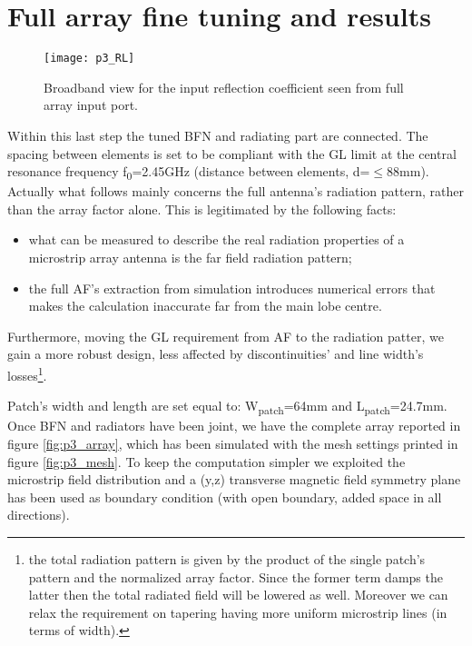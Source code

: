 
\newpage
\section{Full array fine tuning and results}

\begin{figure}[t] 
	\centering
	\texttt{[image: p3\_RL]}
	\caption{Broadband view for the input reflection coefficient seen from full array input port.}
	\label{fig:p3_scattering}
\end{figure}
Within this last step the tuned BFN and radiating part are connected. The spacing between elements is set to be compliant with the GL limit at the central resonance frequency f\textsubscript{0}=2.45GHz (distance between elements, d=$\leq$88mm). 
Actually what follows mainly concerns the full antenna's radiation pattern, rather than the array factor alone. This is legitimated by the following facts:
\begin{itemize}
	\item what can be measured to describe the real radiation properties of a microstrip array antenna is the far field radiation pattern;
	\item the full AF's extraction from simulation introduces numerical errors that makes the calculation inaccurate far from the main lobe centre.
\end{itemize}
Furthermore,  moving the GL requirement from AF to the radiation patter, we gain a more robust design, less affected by discontinuities' and line width's losses\footnote{the total radiation pattern is given by the product of the single patch's pattern and the normalized array factor. Since the former term damps the latter then the total radiated field will be lowered as well. Moreover we can relax the requirement on tapering having more uniform microstrip lines (in terms of width).}.  

Patch's width and length are set equal to: W\textsubscript{patch}=64mm and L\textsubscript{patch}=24.7mm. Once BFN and radiators have been joint, we have the complete array reported in figure \ref{fig:p3_array}, which has been simulated with the mesh settings printed in figure \ref{fig:p3_mesh}. To keep the computation simpler we exploited the microstrip field distribution and a (y,z) transverse magnetic field symmetry plane has been used as boundary condition (with open boundary, added space in all directions).

